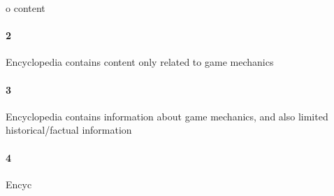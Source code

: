 o content\paragraph{2}Encyclopedia contains content only related to game mechanics\paragraph{3}Encyclopedia contains information about game mechanics, and also limited historical/factual information\paragraph{4}Encyc
